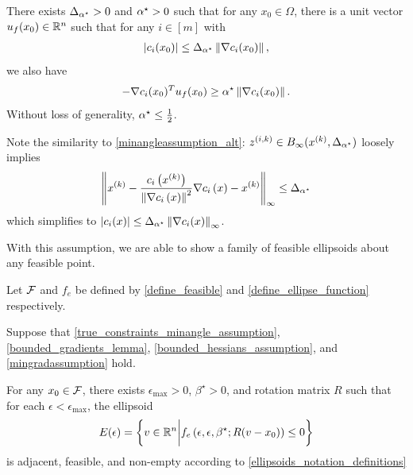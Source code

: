 
\begin{assumption}
\label{true_constraints_minangle_assumption}
There exists ${\Delta_{\alpha^{\star}}} > 0$ and ${ \alpha^{\star} } > 0$ such that for any $x_0 \in \Omega$,
there is a unit vector ${u_{f}(x_0)} \in \mathbb R^n$ such that 
for any $i \in [m]$ with
\begin{align*}
\left|c_i(x_0)\right| \le {\Delta_{\alpha^{\star}}} \left\|\nabla c_i(x_0)\right\|,
\end{align*}
we also have
\begin{align*}
-\nabla c_i(x_0)^T {u_{f}(x_0)} \ge { \alpha^{\star} } \left\| \nabla c_i(x_0) \right\|.
\end{align*}
Without loss of generality, ${ \alpha^{\star} } \le \frac 1 2$.
\end{assumption}

Note the similarity to \cref{minangleassumption_alt}:
${z^{(i, k)}} \in B_{\infty}(x^{(k)}, {\Delta_{\alpha^{\star}}})$ loosely implies
\begin{align*}
\left\|x^{(k)} - \frac{c_i\left(x^{(k)}\right)}{\left\|\nabla c_i\left(x\right)\right\|^2} \nabla c_i\left(x\right)  - x^{(k)}\right\|_{\infty} \le {\Delta_{\alpha^{\star}}}
\end{align*}
which simplifies to
$\left|c_i(x)\right| \le {\Delta_{\alpha^{\star}}} \left\|\nabla c_i(x)\right\|_{\infty}$.

With this assumption, we are able to show a family of feasible ellipsoids about any feasible point.

\begin{theorem}

\label{nonconvex_ellipsoid_existence}
Let ${\mathcal F}$ and $f_e$ be defined by \cref{define_feasible} and \cref{define_ellipse_function} respectively.

Suppose that 
\cref{true_constraints_minangle_assumption},
\cref{bounded_gradients_lemma},
\cref{bounded_hessians_assumption},
and \cref{mingradassumption} hold.

For any $x_0 \in {\mathcal F}$,
there exists $\epsilon_{\textrm{max}} > 0$, $\beta^{\star}>0$, and rotation matrix $R$ such that for each $\epsilon < \epsilon_{\textrm{max}}$, the ellipsoid
\begin{align*}
E(\epsilon) = \left\{v \in \mathbb R^n \bigg| f_e\left(\epsilon, \epsilon, \beta^{\star}; R(v - x_0)\right) \le 0\right\}
\end{align*}
is adjacent, feasible, and non-empty according to \cref{ellipsoids_notation_definitions}
\end{theorem}

